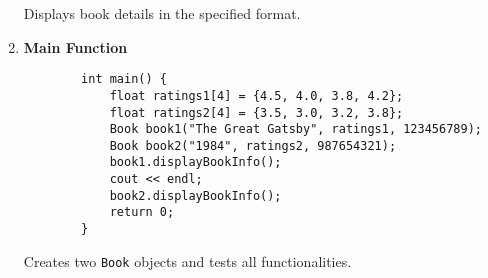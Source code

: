 \documentclass[a4paper,12pt]{article}
\begin{document}
\begin{enumerate}
    Displays book details in the specified format.

    \item \textbf{Main Function}

    \lstset{language=C++}
    \begin{lstlisting}
        int main() {
            float ratings1[4] = {4.5, 4.0, 3.8, 4.2};
            float ratings2[4] = {3.5, 3.0, 3.2, 3.8};
            Book book1("The Great Gatsby", ratings1, 123456789);
            Book book2("1984", ratings2, 987654321);
            book1.displayBookInfo();
            cout << endl;
            book2.displayBookInfo();
            return 0;
        }
    \end{lstlisting}

    Creates two \verb|Book| objects and tests all functionalities.
\end{enumerate}
\end{document}
